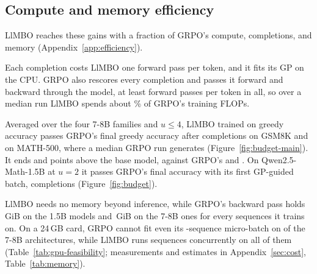 \documentclass[twoside]{article}
\newcommand{\llmbo}{LlMBO}
\begin{document}
\subsection{Compute and memory efficiency}
\label{sec:efficiency}

\llmbo{} reaches these gains with a fraction of GRPO's compute, completions, and memory (Appendix~\ref{app:efficiency}).

Each completion costs \llmbo{} one forward pass per token, and it fits its GP on the CPU. GRPO also rescores every completion and passes it forward and backward through the model, at least \grpoPasses{} forward passes per token in all, so over a median run \llmbo{} spends about \boComputeShare{}\% of GRPO's training FLOPs.

Averaged over the four 7-8B families and $u \le 4$, \llmbo{} trained on greedy accuracy passes GRPO's final greedy accuracy after \reachPoolGreedyGsm{} completions on GSM8K and \reachPoolGreedyMathFive{} on MATH-500, where a median GRPO run generates \grpoCompletions{} (Figure~\ref{fig:budget-main}). It ends \poolEndGreedyGsm{} and \poolEndGreedyMathFive{} points above the base model, against GRPO's \poolEndGrpoGsm{} and \poolEndGrpoMathFive{}. On Qwen2.5-Math-1.5B at $u = 2$ it passes GRPO's final accuracy with its first GP-guided batch, \reachGreedyMathSmallUTwoGsm{} completions (Figure~\ref{fig:budget}).

\llmbo{} needs no memory beyond inference, while GRPO's backward pass holds \grpoOverheadSmall{}\,GiB on the 1.5B models and \grpoOverheadLarge{}\,GiB on the 7-8B ones for every \grpoMicroBatch{} sequences it trains on. On a 24\,GB card, GRPO cannot fit even its \grpoMicroBatch{}-sequence micro-batch on \grpoNoFitSmallCard{} of the \nLargeArch{} 7-8B architectures, while \llmbo{} runs \boSequencesSmallCard{} sequences concurrently on all of them (Table~\ref{tab:gpu-feasibility}; measurements and estimates in Appendix~\ref{sec:cost}, Table~\ref{tab:memory}).
\end{document}
